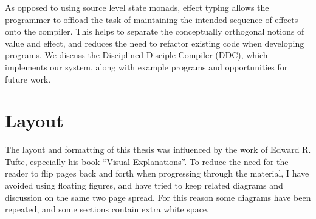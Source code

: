 \documentclass[a4paper,11pt]{book}
\begin{document}
As opposed to using source level state monads, effect typing allows the programmer to offload the task of maintaining the intended sequence of effects onto the compiler. This helps to separate the conceptually orthogonal notions of value and effect, and reduces the need to refactor existing code when developing programs. We discuss the Disciplined Disciple Compiler (DDC), which implements our system, along with example programs and opportunities for future work.

\chapter*{Layout}

The layout and formatting of this thesis was influenced by the work of Edward R. Tufte, especially his book ``Visual Explanations''. To reduce the need for the reader to flip pages back and forth when progressing through the material, I have avoided using floating figures, and have tried to keep related diagrams and discussion on the same two page spread. For this reason some diagrams have been repeated, and some sections contain extra white space.


\tableofcontents








{}



\end{document}
